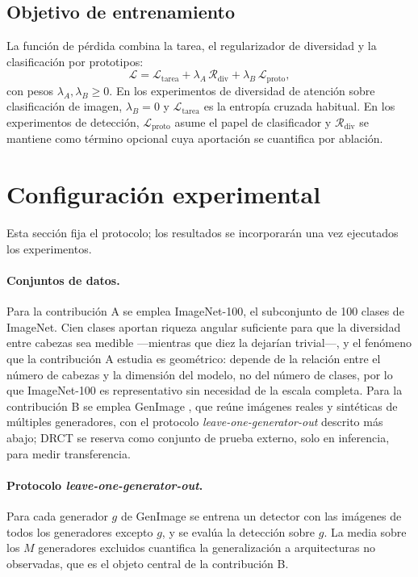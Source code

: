 \documentclass[11pt,a4paper]{article}
\theoremstyle{plain}
\begin{document}
\subsection{Objetivo de entrenamiento}
\label{sec:loss}

La función de pérdida combina la tarea, el regularizador de diversidad y
la clasificación por prototipos:
\begin{equation}
\mathcal{L}
  = \mathcal{L}_{\mathrm{tarea}}
  + \lambda_A\,\mathcal{R}_{\mathrm{div}}
  + \lambda_B\,\mathcal{L}_{\mathrm{proto}},
\label{eq:loss}
\end{equation}
con pesos $\lambda_A,\lambda_B\ge 0$. En los experimentos de diversidad
de atención sobre clasificación de imagen, $\lambda_B=0$ y
$\mathcal{L}_{\mathrm{tarea}}$ es la entropía cruzada habitual. En los
experimentos de detección, $\mathcal{L}_{\mathrm{proto}}$ asume el papel
de clasificador y $\mathcal{R}_{\mathrm{div}}$ se mantiene como término
opcional cuya aportación se cuantifica por ablación.

\section{Configuración experimental}
\label{sec:setup}

Esta sección fija el protocolo; los resultados se incorporarán una vez
ejecutados los experimentos.

\paragraph{Conjuntos de datos.}
Para la contribución A se emplea ImageNet-100, el subconjunto de 100
clases de ImageNet. Cien clases aportan riqueza angular suficiente para
que la diversidad entre cabezas sea medible ---mientras que diez la
dejarían trivial---, y el fenómeno que la contribución A estudia es
geométrico: depende de la relación entre el número de cabezas y la
dimensión del modelo, no del número de clases, por lo que ImageNet-100
es representativo sin necesidad de la escala completa. Para la
contribución B se emplea GenImage \cite{zhu2023genimage}, que reúne
imágenes reales y sintéticas de múltiples generadores, con el protocolo
\emph{leave-one-generator-out} descrito más abajo; DRCT
\cite{chen2024drct} se reserva como conjunto de prueba externo, solo en
inferencia, para medir transferencia.

\paragraph{Protocolo \emph{leave-one-generator-out}.}
Para cada generador $g$ de GenImage se entrena un detector con las
imágenes de todos los generadores excepto $g$, y se evalúa la detección
sobre $g$. La media sobre los $M$ generadores excluidos cuantifica la
generalización a arquitecturas no observadas, que es el objeto central
de la contribución B.
\end{document}
